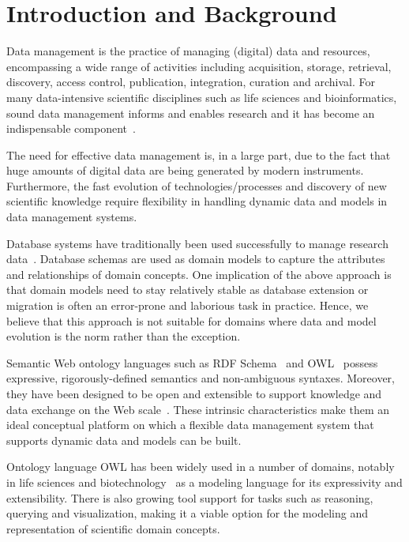 \documentclass{elsarticle}
\begin{document}
\section{Introduction and Background}\label{sec:intro}
Data management is the practice of managing (digital) data
and resources, encompassing a wide range of
activities including acquisition, storage, retrieval, discovery,
access control, publication, integration, curation and archival.
For many data-intensive scientific disciplines such as life sciences and
bioinformatics, sound data management informs and enables
research and it has become an indispensable component~\cite{1107503}.

The need for effective data management is, in a large part, due to
the fact that huge amounts of digital data are being generated by
modern instruments.
Furthermore, the fast evolution of technologies/processes and
discovery of new scientific knowledge require flexibility in
handling dynamic data and models in data management systems.

Database systems have traditionally been used successfully
to manage research data~\cite{brm2007}. Database schemas are
used as domain models to capture the attributes and relationships
of domain concepts. One implication of the above approach is
that domain models need to stay relatively stable as database
extension or migration is often an error-prone and laborious task
in practice. Hence, we believe that this approach is not suitable
for domains where data and model evolution is the
norm rather than the exception.

Semantic Web ontology languages such as RDF
Schema~\cite{rdfschema04} and OWL~\cite{hoph03a} possess
expressive, rigorously-defined
semantics and non-ambiguous syntaxes. Moreover, they have been
designed to be open and extensible to support knowledge and data
exchange on the Web scale~\cite{linkeddata,aue07dbpedia}.
These intrinsic characteristics make them an ideal conceptual
platform on which a flexible data management system that supports
dynamic data and models can be built.

Ontology language OWL has been widely used in a number of domains,
notably in life sciences and
biotechnology~\cite{journals/bib/RuttenbergRSM09,citeulike:1882392,citeulike:212874}
as a modeling language for its expressivity and extensibility. There
is also growing tool support for tasks such as reasoning, querying
and visualization, making it a viable option for the modeling and
representation of scientific domain concepts.
\end{document}
